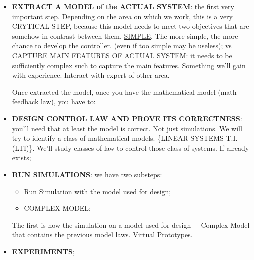 \begin{itemize}

\item \textbf{EXTRACT A MODEL of the ACTUAL SYSTEM}: the first very important step. Depending on the area on which we work, this is a very CRYTICAL STEP, because this model needs to meet two objectives that are somehow in contrast between them. \underline{SIMPLE}. The more simple, the more chance to develop the controller. (even if too simple may be useless); vs \underline{CAPTURE MAIN FEATURES OF ACTUAL SYSTEM}: it needs to be sufficiently complex such to capture the main features. Something we'll gain with experience. Interact with expert of other area.

Once extracted the model, once you have the mathematical model (math feedback law), you have to:

\item \textbf{DESIGN CONTROL LAW AND PROVE ITS CORRECTNESS}: you'll need that at least the model is correct. Not just simulations. We will try to identify a class of mathematical models. \{LINEAR SYSTEMS T.I. (LTI)\}. We'll study classes of law to control those class of systems. If already exists;

\item \textbf{RUN SIMULATIONS}: we have two substeps:
\begin{itemize}
\item Run Simulation with the model used for design;
\item COMPLEX MODEL;
\end{itemize}
The first is now the simulation on a model used for design + Complex Model that contains the previous model laws. Virtual Prototypes.

\item \textbf{EXPERIMENTS};
\end{itemize}